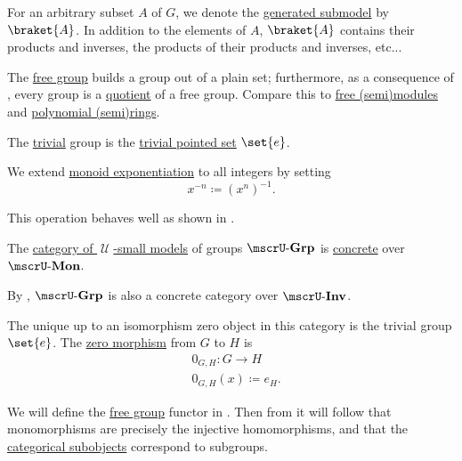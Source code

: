 \begin{definition}
\begin{thmenum}
    For an arbitrary subset \( A \) of \( G \), we denote the \hyperref[def:first_order_generated_substructure]{generated submodel} by \( \braket{ A } \). In addition to the elements of \( A \), \( \braket{ A } \) contains their products and inverses, the products of their products and inverses, etc...

    The \hyperref[def:free_group]{free group} builds a group out of a plain set; furthermore, as a consequence of , every group is a \hyperref[def:group/quotient]{quotient} of a free group. Compare this to \hyperref[def:free_semimodule]{free (semi)modules} and \hyperref[def:polynomial_semiring]{polynomial (semi)rings}.

     The \hyperref[thm:substructures_form_complete_lattice/bottom]{trivial} group is the \hyperref[def:pointed_set/trivial]{trivial pointed set} \( \set{ e } \).

     We extend \hyperref[def:monoid/exponentiation]{monoid exponentiation} to all integers by setting
    \begin{equation*}
      x^{-n} \coloneqq (x^n)^{-1}.
    \end{equation*}

    This operation behaves well as shown in .

     The \hyperref[def:category_of_small_first_order_models]{category of \( \mscrU \)-small models} of groups \( \ucat{Grp} \) is \hyperref[def:concrete_category]{concrete} over \hyperref[def:monoid]{\( \ucat{Mon} \)}.

    By , \( \ucat{Grp} \) is also a concrete category over \( \ucat{Inv} \).

    The unique up to an isomorphism zero object in this category is the trivial group \( \set{ e } \). The \hyperref[def:zero_morphisms/morphism]{zero morphism} from \( G \) to \( H \) is
    \begin{equation*}
      \begin{aligned}
        &0_{G,H}: G \to H \\
        &0_{G,H}(x) \coloneqq e_H.
      \end{aligned}
    \end{equation*}

    We will define the \hyperref[def:free_group]{free group} functor in . Then from  it will follow that monomorphisms are precisely the injective homomorphisms, and that the \hyperref[def:subobject_and_quotient]{categorical subobjects} correspond to subgroups.


\end{thmenum}
\end{definition}

